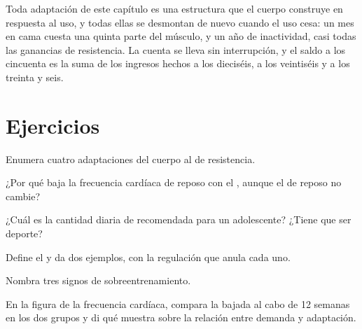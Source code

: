 \begin{remark}\label{rem:g10:sport-and-health:account}
Toda adaptación de este capítulo es una estructura que el cuerpo
construye en respuesta al uso, y todas ellas se desmontan de nuevo
cuando el uso cesa: un mes en cama cuesta una quinta parte del músculo,
y un año de inactividad, casi todas las ganancias de resistencia. La
cuenta se lleva sin interrupción, y el saldo a los cincuenta es la suma
de los ingresos hechos a los dieciséis, a los veintiséis y a los
treinta y seis.
\end{remark}

\section{Ejercicios}

\begin{exercise}[$\star$]\label{exo:g10:sport-and-health:1}
Enumera cuatro adaptaciones del cuerpo al  de resistencia.
\end{exercise}

\begin{exercise}[$\star$]\label{exo:g10:sport-and-health:2}
¿Por qué baja la frecuencia cardíaca de reposo con el ,
aunque el  de reposo no cambie?
\end{exercise}

\begin{exercise}[$\star$]\label{exo:g10:sport-and-health:3}
¿Cuál es la cantidad diaria de  recomendada para un
adolescente? ¿Tiene que ser deporte?
\end{exercise}

\begin{exercise}[$\star$]\label{exo:g10:sport-and-health:4}
Define el  y da dos ejemplos, con la regulación que anula cada
uno.
\end{exercise}

\begin{exercise}[$\star$]\label{exo:g10:sport-and-health:5}
Nombra tres signos de sobreentrenamiento.
\end{exercise}

\begin{exercise}[$\star\star$]\label{exo:g10:sport-and-health:6}
En la figura de la frecuencia cardíaca, compara la bajada al cabo de 12
semanas en los dos grupos y di qué muestra sobre la relación entre
demanda y adaptación.
\end{exercise}

